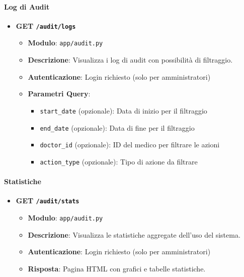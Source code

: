 \documentclass[12pt,a4paper,oneside]{report}
\begin{document}
\paragraph{Log di Audit}
\begin{itemize}
    \item \textbf{GET \texttt{/audit/logs}}
          \begin{itemize}
              \item \textbf{Modulo}: \texttt{app/audit.py}
              \item \textbf{Descrizione}: Visualizza i log di audit con possibilità di filtraggio.
              \item \textbf{Autenticazione}: Login richiesto (solo per amministratori)
              \item \textbf{Parametri Query}:
                    \begin{itemize}
                        \item \texttt{start\_date} (opzionale): Data di inizio per il filtraggio
                        \item \texttt{end\_date} (opzionale): Data di fine per il filtraggio
                        \item \texttt{doctor\_id} (opzionale): ID del medico per filtrare le azioni
                        \item \texttt{action\_type} (opzionale): Tipo di azione da filtrare
                    \end{itemize}
          \end{itemize}
\end{itemize}

\paragraph{Statistiche}
\begin{itemize}
    \item \textbf{GET \texttt{/audit/stats}}
          \begin{itemize}
              \item \textbf{Modulo}: \texttt{app/audit.py}
              \item \textbf{Descrizione}: Visualizza le statistiche aggregate dell'uso del sistema.
              \item \textbf{Autenticazione}: Login richiesto (solo per amministratori)
              \item \textbf{Risposta}: Pagina HTML con grafici e tabelle statistiche.
          \end{itemize}
\end{itemize}
\end{document}
